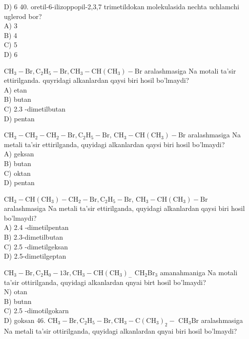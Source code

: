 D) 6
40. oretil-6-ilizoppopil-2,3,7 trimetildokan molekulasida nechta uchlamchi uglerod bor?\\
A) 3\\
B) 4\\
C) 5\\
D) 6
  \item $\mathrm{CH}_{3}-\mathrm{Br}, \mathrm{C}_{2} \mathrm{H}_{5}-\mathrm{Br}, \mathrm{CH}_{3}-\mathrm{CH}\left(\mathrm{CH}_{3}\right)-\mathrm{Br}$ aralashmasiga Na motali ta’sir ettirilganda. quyridagi alkanlardan qaysi biri hosil bo'lmaydi?\\
A) etan\\
B) butan\\
C) 2.3 -dimetilbutan\\
D) pentan
  \item $\mathrm{CH}_{3}-\mathrm{CH}_{2}-\mathrm{CH}_{2}-\mathrm{Br}, \mathrm{C}_{2} \mathrm{H}_{5}-\mathrm{Br}$, $\mathrm{CH}_{3}-\mathrm{CH}\left(\mathrm{CH}_{3}\right)-\mathrm{Br}$ aralashmasiga Na metali ta'sir ettirilganda, quyidagi alkanlardan qaysi biri hosil bo'lmaydi?\\
A) geksan\\
B) butan\\
C) oktan\\
D) pentan
  \item $\mathrm{CH}_{3}-\mathrm{CH}\left(\mathrm{CH}_{3}\right)-\mathrm{CH}_{2}-\mathrm{Br}, \mathrm{C}_{2} \mathrm{H}_{5}-\mathrm{Br}$, $\mathrm{CH}_{3}-\mathrm{CH}\left(\mathrm{CH}_{3}\right)-\mathrm{Br}$ aralashmasiga Na metali ta'sir ettirilganda, quyidagi alkanlardan qaysi biri hosil bo'lmaydi?\\
A) 2.4 -dimetilpentan\\
B) 2.3-dimetilbutan\\
C) 2.5 -dimetilgeksan\\
D) 2.5-dimetilgeptan
  \item $\mathrm{CH}_{3}-\mathrm{Br}, \mathrm{C}_{2} \mathrm{H}_{0}-13 \mathrm{r}, \mathrm{CH}_{3}-\mathrm{CH}\left(\mathrm{CH}_{3}\right)_{-}$ $\mathrm{CH}_{2} \mathrm{Br}_{3}$ amanahmaniga Na motali ta'sir ottirilganda, quyidagi alkanlardan qnyai birt hosil bo'lmaydi?\\
N) otan\\
B) butnn\\
C) 2.5 -dimotilgokarn\\
D) goksan
46. $\mathrm{CH}_{3}-\mathrm{Br}, \mathrm{C}_{2} \mathrm{H}_{5}-\mathrm{Br}, \mathrm{CH}_{3}-\mathrm{C}\left(\mathrm{CH}_{3}\right)_{2}-$ $\mathrm{CH}_{3} \mathrm{Br}$ aralashmasiga Na metali ta'sir ottirilganda, quyidagi alkanlardan qnyai biri hosil bo'lmaydi?\\
